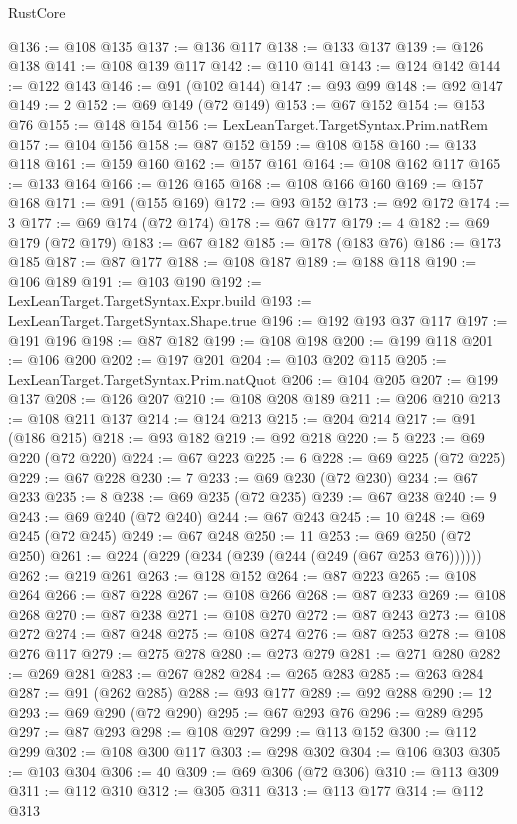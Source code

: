 \begin{lexlean}{RustCore}
\begin{coremodule}
@136 := @108 @135
@137 := @136 @117
@138 := @133 @137
@139 := @126 @138
@141 := @108 @139 @117
@142 := @110 @141
@143 := @124 @142
@144 := @122 @143
@146 := @91 (@102 @144)
@147 := @93 @99
@148 := @92 @147
@149 := 2
@152 := @69 @149 (@72 @149)
@153 := @67 @152
@154 := @153 @76
@155 := @148 @154
@156 := LexLeanTarget.TargetSyntax.Prim.natRem
@157 := @104 @156
@158 := @87 @152
@159 := @108 @158
@160 := @133 @118
@161 := @159 @160
@162 := @157 @161
@164 := @108 @162 @117
@165 := @133 @164
@166 := @126 @165
@168 := @108 @166 @160
@169 := @157 @168
@171 := @91 (@155 @169)
@172 := @93 @152
@173 := @92 @172
@174 := 3
@177 := @69 @174 (@72 @174)
@178 := @67 @177
@179 := 4
@182 := @69 @179 (@72 @179)
@183 := @67 @182
@185 := @178 (@183 @76)
@186 := @173 @185
@187 := @87 @177
@188 := @108 @187
@189 := @188 @118
@190 := @106 @189
@191 := @103 @190
@192 := LexLeanTarget.TargetSyntax.Expr.build
@193 := LexLeanTarget.TargetSyntax.Shape.true
@196 := @192 @193 @37 @117
@197 := @191 @196
@198 := @87 @182
@199 := @108 @198
@200 := @199 @118
@201 := @106 @200
@202 := @197 @201
@204 := @103 @202 @115
@205 := LexLeanTarget.TargetSyntax.Prim.natQuot
@206 := @104 @205
@207 := @199 @137
@208 := @126 @207
@210 := @108 @208 @189
@211 := @206 @210
@213 := @108 @211 @137
@214 := @124 @213
@215 := @204 @214
@217 := @91 (@186 @215)
@218 := @93 @182
@219 := @92 @218
@220 := 5
@223 := @69 @220 (@72 @220)
@224 := @67 @223
@225 := 6
@228 := @69 @225 (@72 @225)
@229 := @67 @228
@230 := 7
@233 := @69 @230 (@72 @230)
@234 := @67 @233
@235 := 8
@238 := @69 @235 (@72 @235)
@239 := @67 @238
@240 := 9
@243 := @69 @240 (@72 @240)
@244 := @67 @243
@245 := 10
@248 := @69 @245 (@72 @245)
@249 := @67 @248
@250 := 11
@253 := @69 @250 (@72 @250)
@261 := @224 (@229 (@234 (@239 (@244 (@249 (@67 @253 @76))))))
@262 := @219 @261
@263 := @128 @152
@264 := @87 @223
@265 := @108 @264
@266 := @87 @228
@267 := @108 @266
@268 := @87 @233
@269 := @108 @268
@270 := @87 @238
@271 := @108 @270
@272 := @87 @243
@273 := @108 @272
@274 := @87 @248
@275 := @108 @274
@276 := @87 @253
@278 := @108 @276 @117
@279 := @275 @278
@280 := @273 @279
@281 := @271 @280
@282 := @269 @281
@283 := @267 @282
@284 := @265 @283
@285 := @263 @284
@287 := @91 (@262 @285)
@288 := @93 @177
@289 := @92 @288
@290 := 12
@293 := @69 @290 (@72 @290)
@295 := @67 @293 @76
@296 := @289 @295
@297 := @87 @293
@298 := @108 @297
@299 := @113 @152
@300 := @112 @299
@302 := @108 @300 @117
@303 := @298 @302
@304 := @106 @303
@305 := @103 @304
@306 := 40
@309 := @69 @306 (@72 @306)
@310 := @113 @309
@311 := @112 @310
@312 := @305 @311
@313 := @113 @177
@314 := @112 @313

\end{coremodule}
\end{lexlean}
